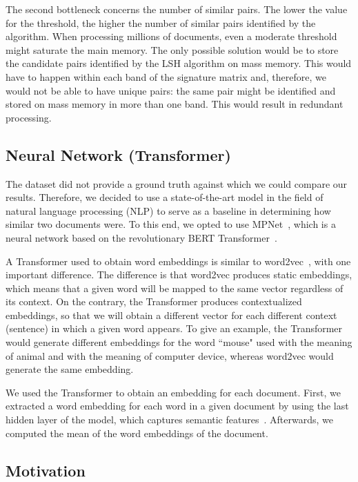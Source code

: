 \documentclass[runningheads]{llncs}
\begin{document}
The second bottleneck concerns the number of similar pairs. The lower the value for the threshold, the higher the number of similar pairs identified by the algorithm. When processing millions of documents, even a moderate threshold might saturate the main memory. The only possible solution would be to store the candidate pairs identified by the LSH algorithm on mass memory. This would have to happen within each band of the signature matrix and, therefore, we would not be able to have unique pairs: the same pair might be identified and stored on mass memory in more than one band. This would result in redundant processing. 

\subsection{Neural Network (Transformer)}
\label{subsec:models:transformer}

The dataset did not provide a ground truth against which we could compare our results. Therefore, we decided to use a state-of-the-art model in the field of natural language processing (NLP) to serve as a baseline in determining how similar two documents were. To this end, we opted to use MPNet~\cite{song_2020}, which is a neural network based on the revolutionary BERT Transformer~\cite{vaswani_2017, devlin-etal-2019-bert}.

A Transformer used to obtain word embeddings is similar to word2vec~\cite{mikolov-etal-2013-word2vec}, with one important difference. The difference is that word2vec produces static embeddings, which means that a given word will be mapped to the same vector regardless of its context. On the contrary, the Transformer produces contextualized embeddings, so that we will obtain a different vector for each different context (sentence) in which a given word appears. To give an example, the Transformer would generate different embeddings for the word “mouse" used with the meaning of animal and with the meaning of computer device, whereas word2vec would generate the same embedding.

We used the Transformer to obtain an embedding for each document. First, we extracted a word embedding for each word in a given document by using the last hidden layer of the model, which captures semantic features~\cite{laicher-etal-2021-explaining}. Afterwards, we computed the mean of the word embeddings of the document.

\subsection{Motivation}
\label{subsec:models:motivation}
\end{document}
